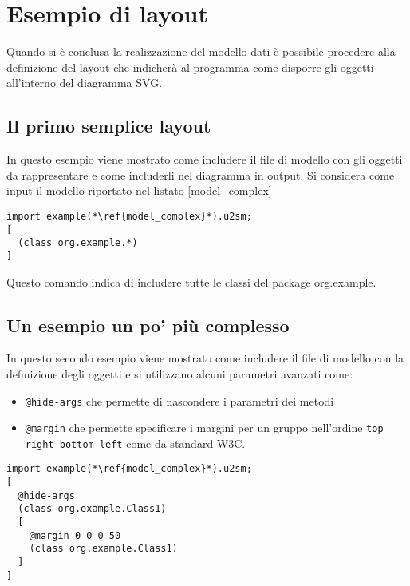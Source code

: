 \section{Esempio di layout}
Quando si è conclusa la realizzazione del modello dati è possibile procedere alla
definizione del layout che indicherà al programma come disporre gli oggetti
all'interno del diagramma SVG.

\subsection{Il primo semplice layout}
In questo esempio viene mostrato come includere il file di modello con gli
oggetti da rappresentare e come includerli nel diagramma in output. Si considera
come input il modello riportato nel listato \ref{model_complex}

\begin{lstlisting}[language=layout, caption={Un semplice esempio}, style={layout}, label=layout_simple]
import example(*\ref{model_complex}*).u2sm;
[
  (class org.example.*)
]
\end{lstlisting}

Questo comando indica di includere tutte le classi del package org.example.

\subsection{Un esempio un po' più complesso}
In questo secondo esempio viene mostrato come includere il file di modello con
la definizione degli oggetti e si utilizzano alcuni parametri avanzati come:
\begin{itemize}
\item \lstinline{@hide-args} che permette di nascondere i parametri dei metodi
\item \lstinline{@margin} che permette specificare i margini per un gruppo 
nell'ordine \lstinline{top right bottom left} come da standard W3C.
\end{itemize}

\begin{lstlisting}[language=layout, caption={Un semplice esempio}, style={layout}, label=layout_simple]
import example(*\ref{model_complex}*).u2sm;
[
  @hide-args
  (class org.example.Class1)
  [
    @margin 0 0 0 50
    (class org.example.Class1)
  ]
]
\end{lstlisting}
